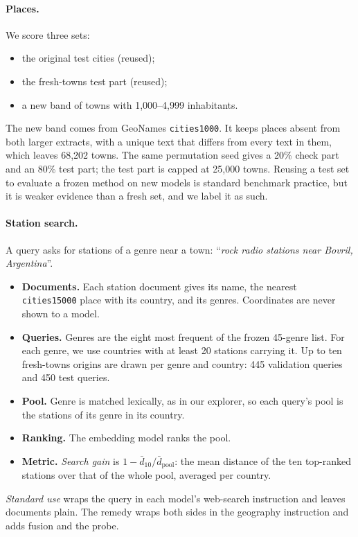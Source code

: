 \paragraph{Places.} We score three sets:
\begin{itemize}
\item the original test cities (reused);
\item the fresh-towns test part (reused);
\item a new band of towns with 1,000--4,999 inhabitants.
\end{itemize}
The new band comes from GeoNames \texttt{cities1000}. It keeps places absent from both larger extracts, with a unique text that differs from every text in them, which leaves 68,202 towns. The same permutation seed gives a 20\% check part and an 80\% test part; the test part is capped at 25,000 towns. Reusing a test set to evaluate a frozen method on new models is standard benchmark practice, but it is weaker evidence than a fresh set, and we label it as such.

\paragraph{Station search.} A query asks for stations of a genre near a town: ``\textit{rock radio stations near Bovril, Argentina}''.
\begin{itemize}
\item \textbf{Documents.} Each station document gives its name, the nearest \texttt{cities15000} place with its country, and its genres. Coordinates are never shown to a model.
\item \textbf{Queries.} Genres are the eight most frequent of the frozen 45-genre list. For each genre, we use countries with at least 20 stations carrying it. Up to ten fresh-towns origins are drawn per genre and country: 445 validation queries and 450 test queries.
\item \textbf{Pool.} Genre is matched lexically, as in our explorer, so each query's pool is the stations of its genre in its country.
\item \textbf{Ranking.} The embedding model ranks the pool.
\item \textbf{Metric.} \emph{Search gain} is $1-\bar d_{10}/\bar d_{\mathrm{pool}}$: the mean distance of the ten top-ranked stations over that of the whole pool, averaged per country.
\end{itemize}
\emph{Standard use} wraps the query in each model's web-search instruction and leaves documents plain. The remedy wraps both sides in the geography instruction and adds fusion and the probe.

